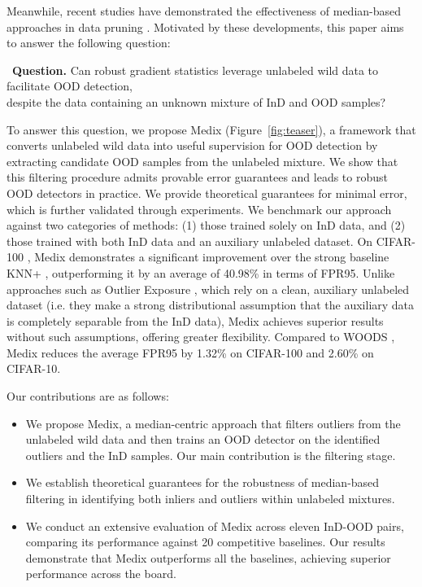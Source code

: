 \documentclass[10pt]{article} %
\theoremstyle{plain}
\theoremstyle{definition}
\begin{document}
Meanwhile, recent studies have demonstrated the effectiveness of median-based approaches in data pruning \citep{acharya2024geometric}. 
Motivated by these developments, this paper aims to answer the following question:

\begin{tcolorbox}[
  colback=boxyellow,
  colbacktitle=BoxTitleYellow,
  coltitle=black,
  colframe=boxyellowframe,
  arc=1.5pt,
  boxrule=1pt,
    left=6pt,right=6pt,top=6pt,bottom=6pt,
    breakable
]
\centering
{}\  \textbf{Question.} Can robust gradient statistics leverage unlabeled wild data to facilitate OOD detection, \\ despite the data containing an unknown mixture of InD and OOD samples?
\end{tcolorbox}



To answer this question, we propose Medix (Figure~\ref{fig:teaser}), a framework that converts unlabeled wild data into useful supervision for OOD detection by extracting candidate OOD samples from the unlabeled mixture. We show that this filtering procedure admits provable error guarantees and leads to robust OOD detectors in practice. We provide theoretical guarantees for minimal error, which is further validated through experiments. We benchmark our approach against two categories of methods: (1) those trained solely on InD data, and (2) those trained with both InD data and an auxiliary unlabeled dataset. On CIFAR-100 \citep{krizhevsky2009learning}, Medix demonstrates a significant improvement over the strong baseline KNN+ \citep{sun2022out}, outperforming it by an average of 40.98\% in terms of FPR95. Unlike approaches such as Outlier Exposure \citep{hendrycks2018deep}, which rely on a clean, auxiliary unlabeled dataset (i.e. they make a strong distributional assumption that the auxiliary data is completely separable from the InD data), Medix achieves superior results without such assumptions, offering greater flexibility.
Compared to WOODS \citep{pmlr-v162-katz-samuels22a}, Medix reduces the average FPR95 by 1.32\% on CIFAR-100 and 2.60\% on CIFAR-10.


Our contributions are as follows:
\begin{itemize}
\itemsep-0.1em
  \item[\bf C1)]  We propose {Medix}, a median-centric approach that filters outliers from the unlabeled wild data and then trains an OOD detector on the identified outliers and the InD samples. Our main contribution is the filtering stage. 

\item[\bf C2)]We establish theoretical guarantees for the robustness of median-based filtering in identifying both inliers and outliers within unlabeled mixtures.  
  \item[\bf C3)]
  We conduct an extensive evaluation of Medix across eleven InD-OOD pairs, comparing its performance against 20 competitive baselines. Our results demonstrate that Medix outperforms all the baselines, achieving superior performance across the board. 
\end{itemize}
\end{document}
